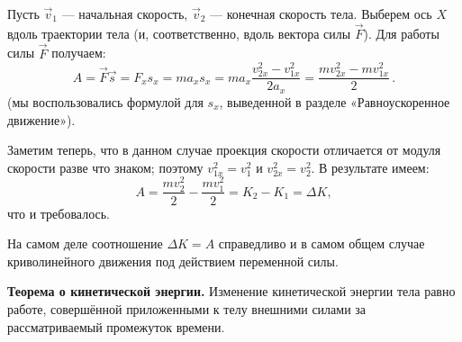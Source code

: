 Пусть $\vec v_1$ — начальная скорость, $\vec v_2$ — конечная скорость тела. Выберем ось $X$ вдоль тра\-ек\-тории тела (и, соответственно, вдоль вектора силы $\vec F$). Для работы силы $\vec F$ получаем:
\vskip-2.801bp\relax
$$A=\vec F\vec s=F_xs_x=ma_xs_x=ma_x\frac{v_{2x}^2-v_{1x}^2}{2a_x}=\frac{mv_{2x}^2-mv_{1x}^2}{2}\,.$$
\vskip2.181bp\relax
\noindent (мы воспользовались формулой для $s_x$, выведенной в разделе «Равноускоренное движение»).

Заметим теперь, что в данном случае проекция скорости отличается от модуля скорости разве что знаком; поэтому $v_{1x}^2=v_1^2$ и $v_{2x}^2=v_2^2$. В результате имеем:
\vskip-2.833bp\relax
$$A=\frac{mv_2^2}{2}-\frac{mv_1^2}{2}=K_2-K_1=\Delta K,$$
\vskip2.181bp\relax
\noindent что и требовалось.

На самом деле соотношение $\Delta K=A$ справедливо и в самом общем случае криволинейного движе\-ния под действием переменной силы.

\vskip5.146bp\relax
\noindent\textbf{Теорема о кинетической энер\-гии.} Изменение кинетической энер\-гии тела равно работе, со\-вершённой приложенными к телу внешними силами за рассматриваемый промежуток времени.
\newpage
